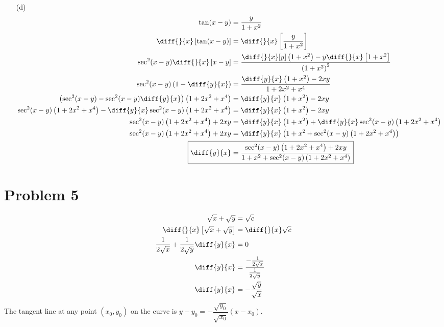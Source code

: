 \documentclass{article}
\begin{document}
\begin{itemize}
\item[(d)]
	\begin{align*}
		\tan(x-y)&=\frac{y}{1+x^2} \\
		\diff{}{x}\left[\tan(x-y)\right]&=\diff{}{x}\left[\frac{y}{1+x^2}\right] \\
		\sec^2(x-y)\diff{}{x}\left[x-y\right]&=\frac{\diff{}{x}[y]\left(1+x^2\right)-y\diff{}{x}\left[1+x^2\right]}{\left(1+x^2\right)^2} \\
		\sec^2(x-y)\left(1-\diff{y}{x}\right)&=\frac{\diff{y}{x}\left(1+x^2\right)-2xy}{1+2x^2+x^4} \\
		\left(\sec^2(x-y)-\sec^2(x-y)\diff{y}{x}\right)\left(1+2x^2+x^4\right)&=\diff{y}{x}\left(1+x^2\right)-2xy \\
		\sec^2(x-y)\left(1+2x^2+x^4\right)-\diff{y}{x}\sec^2(x-y)\left(1+2x^2+x^4\right)&=\diff{y}{x}\left(1+x^2\right)-2xy \\
		\sec^2(x-y)\left(1+2x^2+x^4\right)+2xy&=\diff{y}{x}\left(1+x^2\right)+\diff{y}{x}\sec^2(x-y)\left(1+2x^2+x^4\right) \\
		\sec^2(x-y)\left(1+2x^2+x^4\right)+2xy&=\diff{y}{x}\left(1+x^2+\sec^2(x-y)\left(1+2x^2+x^4\right)\right) \\
		\Aboxed{\diff{y}{x}&=\frac{\sec^2(x-y)\left(1+2x^2+x^4\right)+2xy}{1+x^2+\sec^2(x-y)\left(1+2x^2+x^4\right)}}
	\end{align*}
\end{itemize}


\section*{Problem 5}
\begin{align*}
	\sqrt{x}+\sqrt{y}&=\sqrt{c} \\
	\diff{}{x}\left[\sqrt{x}+\sqrt{y}\right]&=\diff{}{x}\sqrt{c} \\
	\frac{1}{2\sqrt{x}}+\frac{1}{2\sqrt{y}}\diff{y}{x}&=0 \\
	\diff{y}{x}&=\frac{-\frac{1}{2\sqrt{x}}}{\frac{1}{2\sqrt{y}}} \\
	\diff{y}{x}&=-\frac{\sqrt{y}}{\sqrt{x}}
\end{align*}
The tangent line at any point $(x_0,y_0)$ on the curve is $
y-y_0=-\dfrac{\sqrt{y_0}}{\sqrt{x_0}}(x-x_0)$.
\end{document}
